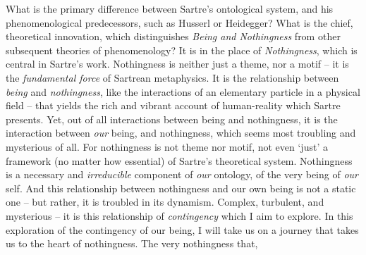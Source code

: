 
What is the primary difference between Sartre's ontological system, and his phenomenological predecessors, such as Husserl or Heidegger? What is the chief, theoretical innovation, which distinguishes \emph{Being and Nothingness} from other subsequent theories of phenomenology? It is in the place of \emph{Nothingness}, which is central in Sartre's work. Nothingness is neither just a theme, nor a motif -- it is the \emph{fundamental force} of Sartrean metaphysics. It is the relationship between \emph{being} and \emph{nothingness}, like the interactions of an elementary particle in a physical field -- that yields the rich and vibrant account of human-reality which Sartre presents. Yet, out of all interactions between being and nothingness, it is the interaction between \emph{our} being, and nothingness, which seems most troubling and mysterious of all. For nothingness is not theme nor motif, not even \enquote*{just} a framework (no matter how essential) of Sartre's theoretical system. Nothingness is a necessary and \emph{irreducible} component of \emph{our} ontology, of the very being of \emph{our} self. And this relationship between nothingness and our own being is not a static one -- but rather, it is troubled in its dynamism. Complex, turbulent, and mysterious -- it is this relationship of \emph{contingency} which I aim to explore. In this exploration of the contingency of our being, I will take us on a journey that takes us to the heart of nothingness. The very nothingness that, 
